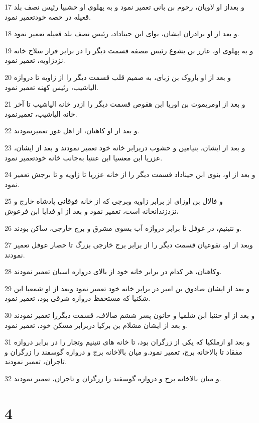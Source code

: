 \par 17 و بعداز او لاویان، رحوم بن بانی تعمیر نمود و به پهلوی او حشبیا رئیس نصف بلد قعیله در حصه خودتعمیر نمود.
\par 18 و بعد از او برادران ایشان، بوای ابن حیناداد، رئیس نصف بلد قعیله تعمیر نمود.
\par 19 و به پهلوی او، عازر بن یشوع رئیس مصفه قسمت دیگر را در برابر فراز سلاح خانه نزدزاویه، تعمیر نمود.
\par 20 و بعد از او باروک بن زبای، به صمیم قلب قسمت دیگر را از زاویه تا دروازه الیاشیب، رئیس کهنه تعمیر نمود.
\par 21 و بعد از اومریموت بن اوریا ابن هقوص قسمت دیگر را ازدر خانه الیاشیب تا آخر خانه الیاشیب، تعمیرنمود.
\par 22 و بعد از او کاهنان، از اهل غور تعمیرنمودند.
\par 23 و بعد از ایشان، بنیامین و حشوب دربرابر خانه خود تعمیر نمودند و بعد از ایشان، عزریا ابن معسیا ابن عننیا به‌جانب خانه خودتعمیر نمود.
\par 24 و بعد از او، بنوی ابن حیناداد قسمت دیگر را از خانه عزریا تا زاویه و تا برجش تعمیر نمود.
\par 25 و فالال بن اوزای از برابر زاویه وبرجی که از خانه فوقانی پادشاه خارج و نزدزندانخانه است، تعمیر نمود و بعد از او فدایا ابن فرعوش،
\par 26 و نتینیم، در عوفل تا برابر دروازه آب بسوی مشرق و برج خارجی، ساکن بودند.
\par 27 وبعد از او، تقوعیان قسمت دیگر را از برابر برج خارجی بزرگ تا حصار عوفل تعمیر نمودند.
\par 28 وکاهنان، هر کدام در برابر خانه خود از بالای دروازه اسبان تعمیر نمودند.
\par 29 و بعد از ایشان صادوق بن امیر در برابر خانه خود تعمیر نمود وبعد از او شمعیا ابن شکنیا که مستحفظ دروازه شرقی بود، تعمیر نمود.
\par 30 و بعد از او حننیا ابن شلمیا و حانون پسر ششم صالاف، قسمت دیگررا تعمیر نمودند و بعد از ایشان مشلام بن برکیا دربرابر مسکن خود، تعمیر نمود.
\par 31 و بعد او ازملکیا که یکی از زرگران بود، تا خانه های نتینیم وتجار را در برابر دروازه مفقاد تا بالاخانه برج، تعمیر نمود.و میان بالاخانه برج و دروازه گوسفند را زرگران و تاجران، تعمیر نمودند.
\par 32 و میان بالاخانه برج و دروازه گوسفند را زرگران و تاجران، تعمیر نمودند.
 
\chapter{4}

